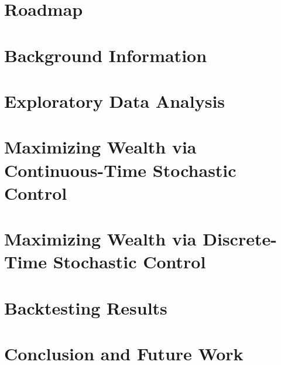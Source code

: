 \documentclass{beamer}
\begin{document}
	
	\addtocounter{framenumber}{-1}
    \maketitle
    \section*{Roadmap}

    \section{Background Information}
    
    
    \section{Exploratory Data Analysis}
    
    
    \section{Maximizing Wealth via Continuous-Time Stochastic Control}
    
    
    \section{Maximizing Wealth via Discrete-Time Stochastic Control}
    

    \section{Backtesting Results}
    
    
    \section{Conclusion and Future Work}
    
    
    \section*{}
    
    
\end{document}
